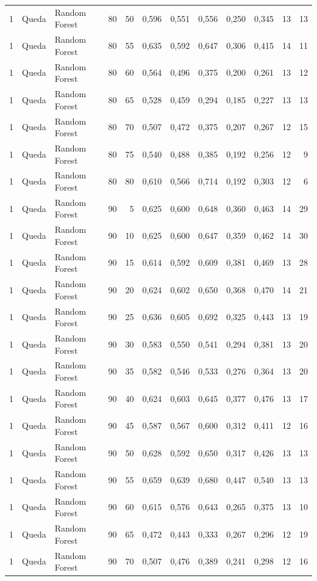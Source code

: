 \begin{longtable}{@{}rllrrrrrrrrr@{}}
1 & Queda & Random Forest & 80 & 50 & 0,596 & 0,551 & 0,556 & 0,250 & 0,345 & 13 & 13 \\
1 & Queda & Random Forest & 80 & 55 & 0,635 & 0,592 & 0,647 & 0,306 & 0,415 & 14 & 11 \\
1 & Queda & Random Forest & 80 & 60 & 0,564 & 0,496 & 0,375 & 0,200 & 0,261 & 13 & 12 \\
1 & Queda & Random Forest & 80 & 65 & 0,528 & 0,459 & 0,294 & 0,185 & 0,227 & 13 & 13 \\
1 & Queda & Random Forest & 80 & 70 & 0,507 & 0,472 & 0,375 & 0,207 & 0,267 & 12 & 15 \\
1 & Queda & Random Forest & 80 & 75 & 0,540 & 0,488 & 0,385 & 0,192 & 0,256 & 12 & 9 \\
1 & Queda & Random Forest & 80 & 80 & 0,610 & 0,566 & 0,714 & 0,192 & 0,303 & 12 & 6 \\
1 & Queda & Random Forest & 90 & 5 & 0,625 & 0,600 & 0,648 & 0,360 & 0,463 & 14 & 29 \\
1 & Queda & Random Forest & 90 & 10 & 0,625 & 0,600 & 0,647 & 0,359 & 0,462 & 14 & 30 \\
1 & Queda & Random Forest & 90 & 15 & 0,614 & 0,592 & 0,609 & 0,381 & 0,469 & 13 & 28 \\
1 & Queda & Random Forest & 90 & 20 & 0,624 & 0,602 & 0,650 & 0,368 & 0,470 & 14 & 21 \\
1 & Queda & Random Forest & 90 & 25 & 0,636 & 0,605 & 0,692 & 0,325 & 0,443 & 13 & 19 \\
1 & Queda & Random Forest & 90 & 30 & 0,583 & 0,550 & 0,541 & 0,294 & 0,381 & 13 & 20 \\
1 & Queda & Random Forest & 90 & 35 & 0,582 & 0,546 & 0,533 & 0,276 & 0,364 & 13 & 20 \\
1 & Queda & Random Forest & 90 & 40 & 0,624 & 0,603 & 0,645 & 0,377 & 0,476 & 13 & 17 \\
1 & Queda & Random Forest & 90 & 45 & 0,587 & 0,567 & 0,600 & 0,312 & 0,411 & 12 & 16 \\
1 & Queda & Random Forest & 90 & 50 & 0,628 & 0,592 & 0,650 & 0,317 & 0,426 & 13 & 13 \\
1 & Queda & Random Forest & 90 & 55 & 0,659 & 0,639 & 0,680 & 0,447 & 0,540 & 13 & 13 \\
1 & Queda & Random Forest & 90 & 60 & 0,615 & 0,576 & 0,643 & 0,265 & 0,375 & 13 & 10 \\
1 & Queda & Random Forest & 90 & 65 & 0,472 & 0,443 & 0,333 & 0,267 & 0,296 & 12 & 19 \\
1 & Queda & Random Forest & 90 & 70 & 0,507 & 0,476 & 0,389 & 0,241 & 0,298 & 12 & 16 \\

\end{longtable}
